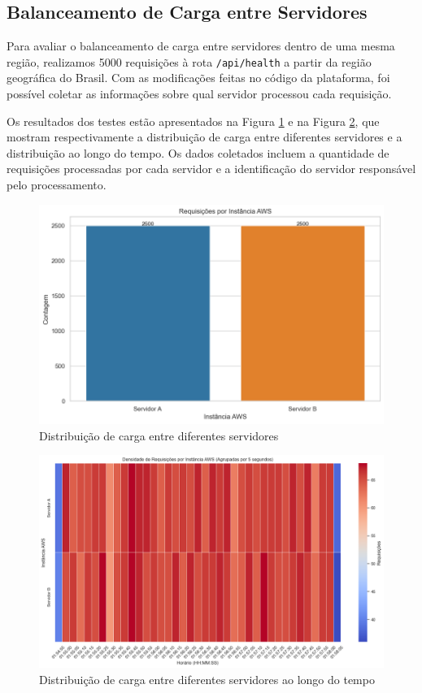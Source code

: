 \subsection{Balanceamento de Carga entre Servidores}

Para avaliar o balanceamento de carga entre servidores dentro de uma mesma região, realizamos 5000 requisições à rota \texttt{/api/health} a partir da região geográfica do Brasil. Com as modificações feitas no código da plataforma, foi possível coletar as informações sobre qual servidor processou cada requisição.

Os resultados dos testes estão apresentados na Figura \ref{fig:reqs-per-instance} e na Figura \ref{fig:reqs-per-instance-over-time}, que mostram respectivamente a distribuição de carga entre diferentes servidores e a distribuição ao longo do tempo. Os dados coletados incluem a quantidade de requisições processadas por cada servidor e a identificação do servidor responsável pelo processamento.

\begin{figure}[H]
    \centering
    \includegraphics[width=1\textwidth]{assets/balance-test/reqs-per-instance.png}
    \caption{Distribuição de carga entre diferentes servidores}
    \label{fig:reqs-per-instance}
\end{figure}

\begin{figure}[H]
    \centering
    \includegraphics[width=1\textwidth]{assets/balance-test/reqs-per-instance-over-time.png}
    \caption{Distribuição de carga entre diferentes servidores ao longo do tempo}
    \label{fig:reqs-per-instance-over-time}
\end{figure}

